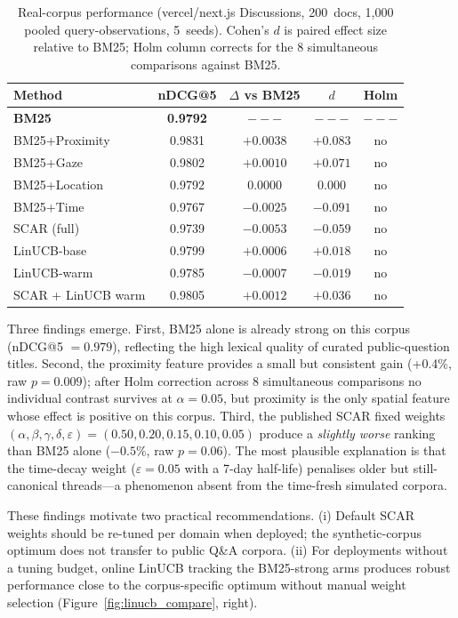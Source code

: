 \documentclass[journal]{IEEEtran}
\begin{document}
\begin{table}[htbp]
\centering
\caption{Real-corpus performance (vercel/next.js Discussions, 200~docs, 1{,}000 pooled query-observations, 5~seeds). Cohen's $d$ is paired effect size relative to BM25; Holm column corrects for the 8 simultaneous comparisons against BM25.}
\label{tab:real_corpus}
\begin{tabular}{lcccc}
\hline
\textbf{Method} & \textbf{nDCG@5} & \textbf{$\Delta$ vs BM25} & \textbf{$d$} & \textbf{Holm} \\
\hline
\textbf{BM25}              & \textbf{0.9792} & $---$ & $---$ & $---$ \\
BM25+Proximity             & 0.9831 & $+0.0038$ & $+0.083$ & no \\
BM25+Gaze                  & 0.9802 & $+0.0010$ & $+0.071$ & no \\
BM25+Location              & 0.9792 & $0.0000$  & $0.000$  & no \\
BM25+Time                  & 0.9767 & $-0.0025$ & $-0.091$ & no \\
SCAR (full)                & 0.9739 & $-0.0053$ & $-0.059$ & no \\
LinUCB-base                & 0.9799 & $+0.0006$ & $+0.018$ & no \\
LinUCB-warm                & 0.9785 & $-0.0007$ & $-0.019$ & no \\
SCAR + LinUCB warm         & 0.9805 & $+0.0012$ & $+0.036$ & no \\
\hline
\end{tabular}
\end{table}

Three findings emerge. First, BM25 alone is already strong on this corpus
(nDCG@5 $= 0.979$), reflecting the high lexical quality of curated
public-question titles. Second, the proximity feature provides a small but
consistent gain (+0.4\%, raw $p = 0.009$); after Holm correction across 8
simultaneous comparisons no individual contrast survives at $\alpha = 0.05$,
but proximity is the only spatial feature whose effect is positive on this
corpus. Third, the published SCAR fixed weights $(\alpha, \beta, \gamma,
\delta, \varepsilon) = (0.50, 0.20, 0.15, 0.10, 0.05)$ produce a
\emph{slightly worse} ranking than BM25 alone ($-0.5\%$, raw $p = 0.06$).
The most plausible explanation is that the time-decay weight ($\varepsilon =
0.05$ with a 7-day half-life) penalises older but still-canonical
threads---a phenomenon absent from the time-fresh simulated corpora.

These findings motivate two practical recommendations. (i) Default SCAR
weights should be re-tuned per domain when deployed; the synthetic-corpus
optimum does not transfer to public Q\&A corpora. (ii) For deployments without
a tuning budget, online LinUCB tracking the BM25-strong arms produces robust
performance close to the corpus-specific optimum without manual weight
selection (Figure~\ref{fig:linucb_compare}, right).
\end{document}
